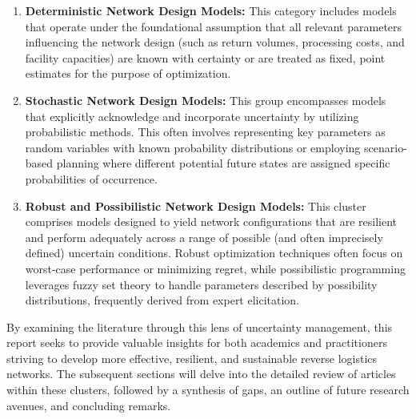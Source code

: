 \begin{enumerate}
    \item \textbf{Deterministic Network Design Models:} This category includes models that operate under the foundational assumption that all relevant parameters influencing the network design (such as return volumes, processing costs, and facility capacities) are known with certainty or are treated as fixed, point estimates for the purpose of optimization.
    \item \textbf{Stochastic Network Design Models:} This group encompasses models that explicitly acknowledge and incorporate uncertainty by utilizing probabilistic methods. This often involves representing key parameters as random variables with known probability distributions or employing scenario-based planning where different potential future states are assigned specific probabilities of occurrence.
    \item \textbf{Robust and Possibilistic Network Design Models:} This cluster comprises models designed to yield network configurations that are resilient and perform adequately across a range of possible (and often imprecisely defined) uncertain conditions. Robust optimization techniques often focus on worst-case performance or minimizing regret, while possibilistic programming leverages fuzzy set theory to handle parameters described by possibility distributions, frequently derived from expert elicitation.
\end{enumerate}

By examining the literature through this lens of uncertainty management, this report seeks to provide valuable insights for both academics and practitioners striving to develop more effective, resilient, and sustainable reverse logistics networks. The subsequent sections will delve into the detailed review of articles within these clusters, followed by a synthesis of gaps, an outline of future research avenues, and concluding remarks.